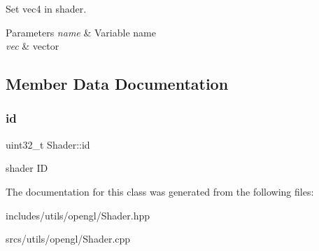 Set vec4 in shader. 


\begin{DoxyParams}{Parameters}
{\em name} & Variable name \\
\hline
{\em vec} & vector \\
\hline
\end{DoxyParams}


\subsection{Member Data Documentation}
\mbox{\label{class_shader_af4508ba23f3f3c9a38791bce60dc08dc}} 
\subsubsection{\texorpdfstring{id}{id}}
{\footnotesize\ttfamily uint32\+\_\+t Shader\+::id}

shader ID 

The documentation for this class was generated from the following files\+:\begin{DoxyCompactItemize}
\item 
includes/utils/opengl/Shader.\+hpp\item 
srcs/utils/opengl/Shader.\+cpp\end{DoxyCompactItemize}
